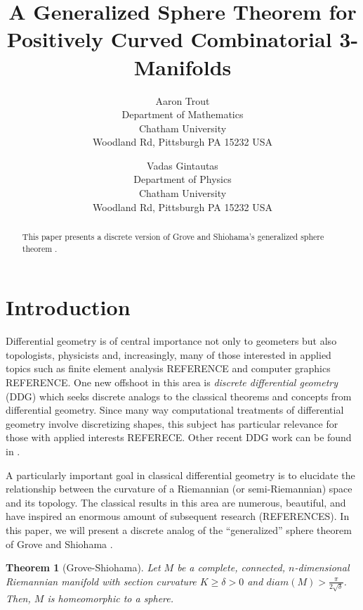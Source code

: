 \documentclass[12pt]{article}
\newtheorem{thm}{Theorem}[section]
\begin{document}
\nocite{*}

\title{A Generalized Sphere Theorem for Positively Curved Combinatorial 3-Manifolds}

\author{Aaron Trout \\ Department of Mathematics \\
Chatham University \\ Woodland Rd, Pittsburgh PA 15232 USA \and
Vadas Gintautas\\ Department of Physics \\
Chatham University \\ Woodland Rd, Pittsburgh PA 15232 USA}


\maketitle

\begin{abstract}
  This paper presents a discrete version of Grove and Shiohama's generalized sphere theorem \cite{groveshiohama}.
\end{abstract}


\section{Introduction}

Differential geometry is of central importance not only to geometers but also topologists, physicists and, increasingly, many of those interested in applied topics such as finite element analysis REFERENCE and computer graphics REFERENCE. One new offshoot in this area is {\em discrete differential geometry} (DDG) which seeks discrete analogs to the classical theorems and concepts from differential geometry. Since many way computational treatments of differential geometry involve discretizing shapes, this subject has particular relevance for those with applied interests REFERECE. Other recent DDG work can be found in \cite{BMM,Crowley,EMM,forman2,GGL1,GGL2,GGL3,LS,stone}. 

A particularly important goal in classical differential geometry is to elucidate the relationship between the curvature of a Riemannian (or semi-Riemannian) space and its topology. The classical
results in this area are numerous, beautiful, and have inspired an
enormous amount of subsequent research (REFERENCES). In this paper, we will present a discrete analog of the ``generalized'' sphere theorem of Grove and Shiohama \cite{groveshiohama}.

\begin{thm}[Grove-Shiohama] Let $M$ be a complete, connected, $n$-dimensional Riemannian manifold with section curvature $K \geq \delta > 0$ and $diam(M) > \frac{\pi}{2\sqrt{\delta}}$. Then, $M$ is homeomorphic to a sphere.
\end{thm}
\end{document}
